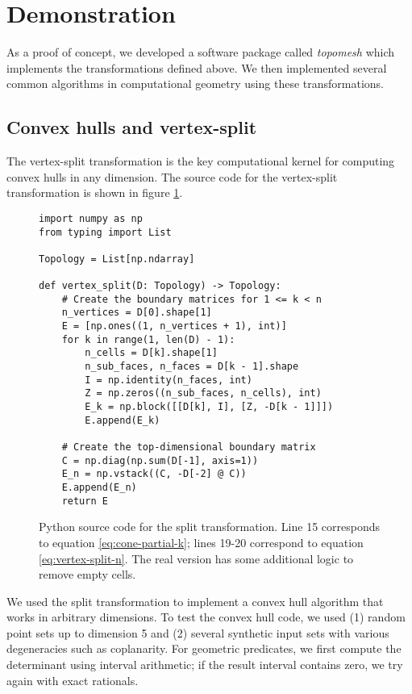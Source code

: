 \documentclass[twocolumn]{article}
\begin{document}
\section{Demonstration}

As a proof of concept, we developed a software package called \emph{topomesh} which implements the transformations defined above.
We then implemented several common algorithms in computational geometry using these transformations.

\subsection{Convex hulls and vertex-split}

The vertex-split transformation is the key computational kernel for computing convex hulls in any dimension.
The source code for the vertex-split transformation is shown in figure \ref{fig:split-source-code}.
\begin{figure}
    \begin{verbatim}
import numpy as np
from typing import List

Topology = List[np.ndarray]

def vertex_split(D: Topology) -> Topology:
    # Create the boundary matrices for 1 <= k < n
    n_vertices = D[0].shape[1]
    E = [np.ones((1, n_vertices + 1), int)]
    for k in range(1, len(D) - 1):
        n_cells = D[k].shape[1]
        n_sub_faces, n_faces = D[k - 1].shape
        I = np.identity(n_faces, int)
        Z = np.zeros((n_sub_faces, n_cells), int)
        E_k = np.block([[D[k], I], [Z, -D[k - 1]]])
        E.append(E_k)

    # Create the top-dimensional boundary matrix
    C = np.diag(np.sum(D[-1], axis=1))
    E_n = np.vstack((C, -D[-2] @ C))
    E.append(E_n)
    return E
    \end{verbatim}
    \caption{Python source code for the split transformation.
    Line 15 corresponds to equation \eqref{eq:cone-partial-k}; lines 19-20 correspond to equation \eqref{eq:vertex-split-n}.
    The real version has some additional logic to remove empty cells.}
    \label{fig:split-source-code}
\end{figure}

We used the split transformation to implement a convex hull algorithm that works in arbitrary dimensions.
To test the convex hull code, we used (1) random point sets up to dimension 5 and (2) several synthetic input sets with various degeneracies such as coplanarity.
For geometric predicates, we first compute the determinant using interval arithmetic; if the result interval contains zero, we try again with exact rationals.
\end{document}
